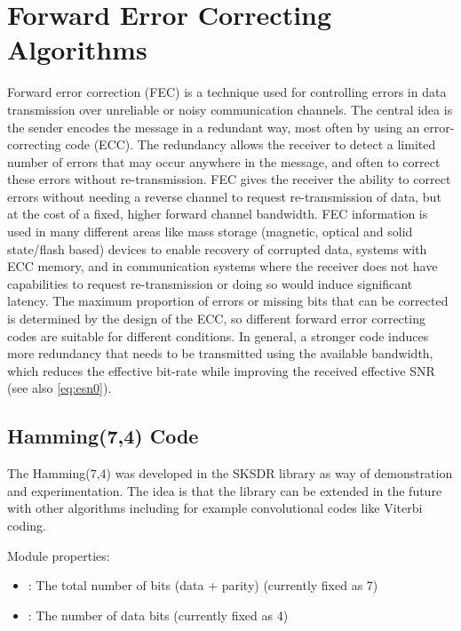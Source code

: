 \section{Forward Error Correcting Algorithms}
Forward error correction (FEC) is a technique used for controlling errors in data transmission over unreliable or noisy communication channels. The central idea is the sender encodes the message in a redundant way, most often by using an error-correcting code (ECC). The redundancy allows the receiver to detect a limited number of errors that may occur anywhere in the message, and often to correct these errors without re-transmission. FEC gives the receiver the ability to correct errors without needing a reverse channel to request re-transmission of data, but at the cost of a fixed, higher forward channel bandwidth. FEC information is used in many different areas like mass storage (magnetic, optical and solid state/flash based) devices to enable recovery of corrupted data, systems with ECC memory, and in communication systems where the receiver does not have capabilities to request re-transmission or doing so would induce significant latency.
The maximum proportion of errors or missing bits that can be corrected is determined by the design of the ECC, so different forward error correcting codes are suitable for different conditions. In general, a stronger code induces more redundancy that needs to be transmitted using the available bandwidth, which reduces the effective bit-rate while improving the received effective SNR \cite{sackinger2017} (see also \eqref{eq:esn0}).

\subsection{Hamming(7,4) Code}

The Hamming(7,4) was developed in the SKSDR library as way of demonstration and experimentation. The idea is that the library can be extended in the future with other algorithms including for example convolutional codes like Viterbi coding.

\noindent Module properties:
\begin{itemize}
  \item {}: The total number of bits (data + parity) (currently fixed as 7)
  \item {}: The number of data bits (currently fixed as 4)
\end{itemize}

